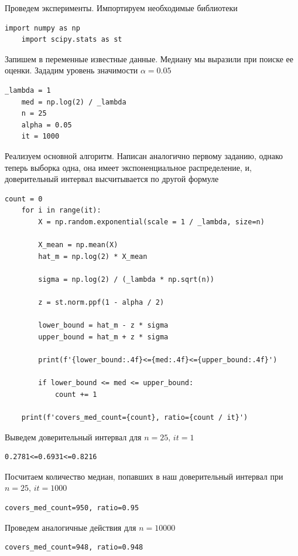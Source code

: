 \documentclass[a4paper, 12pt]{article}
\begin{document}
    Проведем эксперименты. Импортируем необходимые библиотеки
    \begin{lstlisting}[label=imps2, caption={Импорт необходимых библиотек}]
    import numpy as np
    import scipy.stats as st
    \end{lstlisting}
    Запишем в переменные известные данные. Медиану мы выразили при поиске ее оценки. Зададим уровень
    значимости $\alpha=0.05$
    \begin{lstlisting}[label=vars2, caption={Запись известных параметров в переменные}]
    _lambda = 1
    med = np.log(2) / _lambda
    n = 25
    alpha = 0.05
    it = 1000
    \end{lstlisting}
    Реализуем основной алгоритм. Написан аналогично первому заданию, однако теперь выборка одна, она
    имеет экспоненциальное распределение, и, доверительный интервал высчитывается по другой формуле
    \begin{lstlisting}[label=code2, caption={Реализация алгоритма для задания 2}]
    count = 0
    for i in range(it):
        X = np.random.exponential(scale = 1 / _lambda, size=n)

        X_mean = np.mean(X)
        hat_m = np.log(2) * X_mean

        sigma = np.log(2) / (_lambda * np.sqrt(n))

        z = st.norm.ppf(1 - alpha / 2)

        lower_bound = hat_m - z * sigma
        upper_bound = hat_m + z * sigma

        print(f'{lower_bound:.4f}<={med:.4f}<={upper_bound:.4f}')

        if lower_bound <= med <= upper_bound:
            count += 1

    print(f'covers_med_count={count}, ratio={count / it}')
    \end{lstlisting}
    Выведем доверительный интервал для $n=25,\,it=1$
    \begin{lstlisting}[label=int2, caption={Доверительный интервал для $n=25$}]
    0.2781<=0.6931<=0.8216
    \end{lstlisting}
    Посчитаем количество медиан, попавших в наш доверительный интервал при $n=25,\,it=1000$
    \begin{lstlisting}[label=n25_2, caption={Количество медиан внутри интервала и отношение при $n=25$}]
    covers_med_count=950, ratio=0.95
    \end{lstlisting}
    Проведем аналогичные действия для $n=10000$
    \begin{lstlisting}[label=n10000_2, caption={Количество медиан внутри интервала и отношение при $n=10000$}]
    covers_med_count=948, ratio=0.948
    \end{lstlisting}
\end{document}

